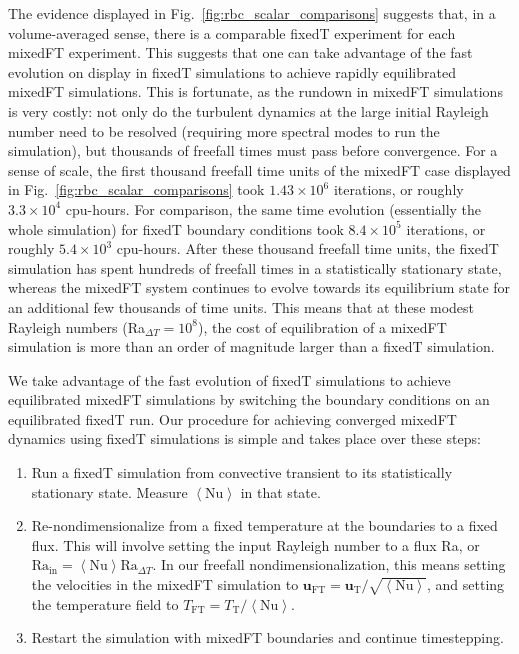 \documentclass[aps, pre, onecolumn, nofootinbib, notitlepage, groupedaddress, amsfonts, amssymb, amsmath, longbibliography]{revtex4-1}
\newcommand{\angles}[1]{\ensuremath{\left\langle #1 \right\rangle}}
\begin{document}
The evidence displayed in Fig.~\ref{fig:rbc_scalar_comparisons} suggests that, in a volume-averaged sense, there is a comparable fixedT experiment for each mixedFT experiment.
This suggests that one can take advantage of the fast evolution on display in fixedT simulations to achieve rapidly equilibrated mixedFT simulations.
This is fortunate, as the rundown in mixedFT simulations is very costly:  not only do the turbulent dynamics at the large initial Rayleigh number need to be resolved (requiring more spectral modes to run the simulation), but thousands of freefall times must pass before convergence.
For a sense of scale, the first thousand freefall time units of the mixedFT case displayed in Fig.~\ref{fig:rbc_scalar_comparisons} took $1.43\times10^6$ iterations, or roughly $3.3 \times 10^4$ cpu-hours.
For comparison, the same time evolution (essentially the whole simulation) for fixedT boundary conditions took  $8.4\times10^5$ iterations, or roughly $5.4\times 10^3$ cpu-hours.
After these thousand freefall time units, the fixedT simulation has spent hundreds of freefall times in a statistically stationary state, whereas the mixedFT system continues to evolve towards its equilibrium state for an additional few thousands of time units.
This means that at these modest Rayleigh numbers (Ra$_{\Delta T} = 10^8$), the cost of equilibration of a mixedFT simulation is more than an order of magnitude larger than a fixedT simulation.

We take advantage of the fast evolution of fixedT simulations to achieve equilibrated mixedFT simulations by switching the boundary conditions on an equilibrated fixedT run.
Our procedure for achieving converged mixedFT dynamics using fixedT simulations is simple and takes place over these steps:
\begin{enumerate}
\item Run a fixedT simulation from convective transient to its statistically stationary state. 
Measure $\angles{\text{Nu}}$ in that state.
\item Re-nondimensionalize from a fixed temperature at the boundaries to a fixed flux.
This will involve setting the input Rayleigh number to a flux Ra, or $\text{Ra}_{\text{in}} = \angles{\text{Nu}}\text{Ra}_{\Delta T}$.
In our freefall nondimensionalization, this means setting the velocities in the mixedFT simulation to $\bm{u}_{\text{FT}} = \bm{u}_{\text{T}} / \sqrt{\angles{\text{Nu}}}$, and setting the temperature field to $T_{\text{FT}} = T_{\text{T}} / \angles{\text{Nu}}$.
\item Restart the simulation with mixedFT boundaries and continue timestepping.
\end{enumerate}
\end{document}
